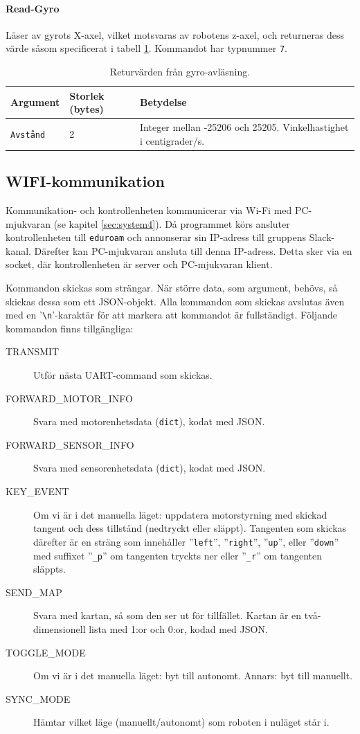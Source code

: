 \documentclass[a4paper,11pt]{article}
\begin{document}
\paragraph{Read-Gyro}
Läser av gyrots X-axel, vilket motsvaras av robotens z-axel, och returneras dess värde såsom specificerat i tabell \ref{tab:gyro}. Kommandot har typnummer \texttt{7}.
\begin{table}[h!]
    \centering
    \begin{tabular}{|l|l|l|}
    \rowcolor{gray!50}
        \hline
        \textbf{Argument} & \textbf{Storlek (bytes)} & \textbf{Betydelse} \\ \hline
        \texttt{Avstånd} & 2 & Integer mellan -25206 och 25205. Vinkelhastighet i centigrader/s. \\ \hline
    \end{tabular}
    \caption{Returvärden från gyro-avläsning.}
    \label{tab:gyro}
\end{table}

\subsection{WIFI-kommunikation}
\label{ssec:wifi}
Kommunikation- och kontrollenheten kommunicerar via Wi-Fi med PC-mjukvaran (se kapitel \ref{sec:system4}). Då programmet körs ansluter kontrollenheten till \texttt{eduroam} och annonserar sin IP-adress till gruppens Slack-kanal. Därefter kan PC-mjukvaran ansluta till denna IP-adress. Detta sker via en socket, där kontrollenheten är server och PC-mjukvaran klient.

Kommandon skickas som strängar. När större data, som argument, behövs, så skickas dessa som ett JSON-objekt.
Alla kommandon som skickas avslutas även med en '\texttt{\textbackslash n}'-karaktär för att markera att kommandot är fullständigt. Följande kommandon finns tillgängliga:

\begin{description}
    \item [TRANSMIT] Utför nästa UART-command som skickas.
    \item [FORWARD\_MOTOR\_INFO] Svara med motorenhetsdata (\texttt{dict}), kodat med JSON.
    \item [FORWARD\_SENSOR\_INFO] Svara med sensorenhetsdata (\texttt{dict}), kodat med JSON.
    \item [KEY\_EVENT] Om vi är i det manuella läget: uppdatera motorstyrning med skickad tangent och dess tillstånd (nedtryckt eller släppt). Tangenten som skickas därefter är en sträng som innehåller ''\texttt{left}'', ''\texttt{right}'', ''\texttt{up}'', eller ''\texttt{down}'' med suffixet ''\texttt{\_p}'' om tangenten tryckts ner eller ''\texttt{\_r}'' om tangenten släppts.
    \item [SEND\_MAP] Svara med kartan, så som den ser ut för tillfället. Kartan är en två-dimensionell lista med 1:or och 0:or, kodad med JSON.
    \item [TOGGLE\_MODE] Om vi är i det manuella läget: byt till autonomt. Annars: byt till manuellt.
    \item [SYNC\_MODE] Hämtar vilket läge (manuellt/autonomt) som roboten i nuläget står i.
\end{description}
\end{document}
